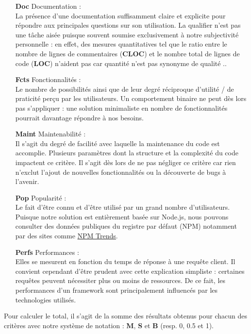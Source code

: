 \begin{itemize}
    \item[\textbf{Doc}] Documentation : \\
    La présence d'une documentation suffisamment claire et explicite pour répondre aux principales questions sur son utilisation.
    La qualifier n'est pas une tâche aisée puisque souvent soumise exclusivement à notre subjectivité personnelle : en effet, des mesures quantitatives tel que le ratio entre le nombre de lignes de commentaires (\textbf{CLOC}) et le nombre total de lignes de code (\textbf{LOC}) n'aident pas car quantité n'est pas synonyme de qualité .. 
    \item[\textbf{Fcts}] Fonctionnalités : \\
    Le nombre de possibilités ainsi que de leur degré réciproque d'utilité / de praticité perçu par les utilisateurs. Un comportement binaire ne peut dès lors pas s'appliquer : une solution minimaliste en nombre de fonctionnalités pourrait davantage répondre à nos besoins.
    \item[\textbf{Maint}] Maintenabilité : \\
    Il s'agit du degré de facilité avec laquelle la maintenance du code est accomplie. Plusieurs paramètres dont la structure et la complexité du code impactent ce critère. Il s'agit dès lors de ne pas négliger ce critère car rien n'exclut l'ajout de nouvelles fonctionnalités ou la découverte de bugs à l'avenir.
    \item[\textbf{Pop}] Popularité : \\
    Le fait d'être connu et d'être utilisé par un grand nombre d'utilisateurs.
    Puisque notre solution est entièrement basée sur Node.js, nous pouvons consulter des données publiques du registre par défaut (NPM) notamment par des sites comme \href{https://www.npmtrends.com/}{NPM Trends}.
    \item[\textbf{Perfs}] Performances : \\
    Elles se mesurent en fonction du temps de réponse à une requête client.
    Il convient cependant d'être prudent avec cette explication simpliste : certaines requêtes peuvent nécessiter plus ou moins de ressources.
    De ce fait, les performances d'un framework sont principalement influencés par les technologies utilisés. 
\end{itemize}

Pour calculer le total, il s'agit de la somme des résultats obtenus pour chacun des critères avec notre système de notation : \textbf{M}, \textbf{S} et \textbf{B} (resp. 0, 0.5 et 1).

